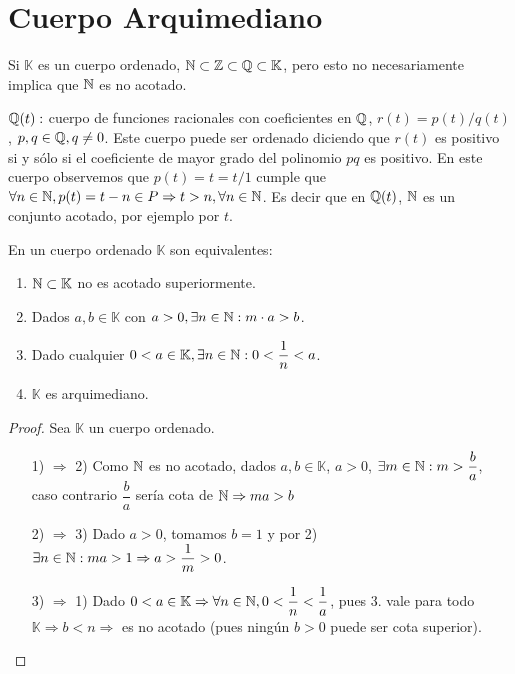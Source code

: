 \section{Cuerpo Arquimediano}

Si $\mathbb{K}$ es un cuerpo ordenado, $\mathbb{N} \subset \mathbb{Z} \subset \mathbb{Q} \subset \mathbb{K}$, pero esto no necesariamente implica que $\mathbb{N}$ es no acotado.

\begin{eg}
    $\mathbb{Q}(t):$ cuerpo de funciones racionales con coeficientes en $\mathbb{Q}$, $r(t) = p(t)/q(t)$, $p, q \in \mathbb{Q}, q \neq 0$. Este cuerpo puede ser ordenado diciendo que $r(t)$ es positivo si y sólo si el coeficiente de mayor grado del polinomio $pq$ es positivo.
    En este cuerpo observemos que $p(t)=t=t/1$ cumple que $\forall n \in \mathbb{N}, p(t)=t-n \in P \Rightarrow t>n, \forall n \in \mathbb{N}$. Es decir que en $\mathbb{Q}(t)$, $\mathbb{N}$ es un conjunto acotado, por ejemplo por $t$.
\end{eg}

\begin{theorem}
    En un cuerpo ordenado $\mathbb{K}$ son equivalentes: \begin{enumerate}
        \item $\mathbb{N} \subset \mathbb{K}$ no es acotado superiormente.
        \item Dados $a, b \in \mathbb{K}$ con $a>0, \exists n \in \mathbb{N}:m \cdot a>b$.
        \item Dado cualquier $0<a \in \mathbb{K}, \exists n \in \mathbb{N} : 0 < \dfrac{1}{n} < a$.
        \item $\mathbb{K}$ es arquimediano.
    \end{enumerate}
    \begin{proof}
        Sea $\mathbb{K}$ un cuerpo ordenado. \begin{enumerate}
            \item[1) $\Rightarrow$ 2)] Como $\mathbb{N}$ es no acotado, dados $a,b \in \mathbb{K}$, $a>0$, $\exists m \in \mathbb{N} : m > \dfrac ba$, caso contrario $\dfrac ba$ sería cota de $\mathbb{N} \Rightarrow ma>b$
            \item[2) $\Rightarrow$ 3)] Dado $a>0$, tomamos $b=1$ y por 2) $\exists n \in \mathbb{N} : ma > 1 \Rightarrow a > \dfrac{1}{m} > 0$.
            \item[3) $\Rightarrow$ 1)] Dado $0<a \in \mathbb{K} \Rightarrow \forall n \in \mathbb{N}, 0<\dfrac 1n<\dfrac 1a$, pues 3. vale para todo $\mathbb{K} \Rightarrow b<n \Rightarrow$ es no acotado (pues ningún $b>0$ puede ser cota superior).
        \end{enumerate}
    \end{proof}
\end{theorem}

